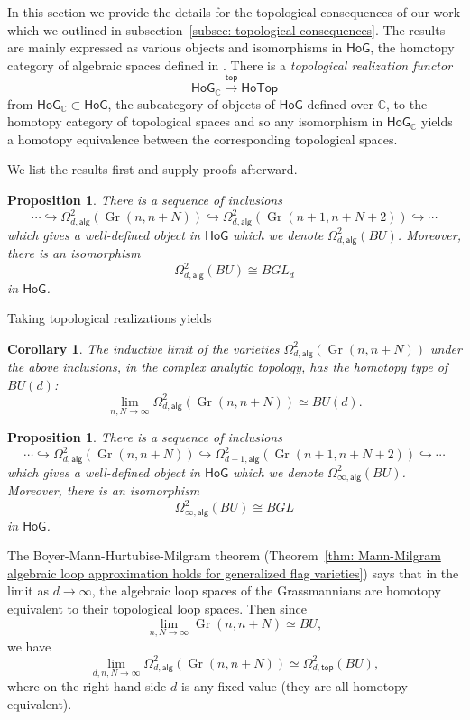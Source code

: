 \message{ !name(Bryan-Vakil.tex)}\documentclass{amsart}
\newtheorem{proposition}[theorem]{Proposition}
\newtheorem{corollary}[theorem]{Corollary}
\theoremstyle{definition}
\newcommand{\CC} {{\mathbb C}}          %
\newcommand{\HoG}{\textsf{HoG}}
\newcommand{\HoTop}{\textsf{HoTop}}
\newcommand{\alg}{\mathsf{alg}}
\renewcommand{\top}{\mathsf{top}}
\newcommand{\Gr}{\operatorname{Gr}}
\newcommand{\LoopTwo}{\Omega^{2}_{d,\alg}}
\newcommand{\LoopTwoTop}{\Omega^{2}_{d,\top}}
\newcommand{\homotopyeq}{\simeq}
\begin{document}
In this section we provide the details for the topological
consequences of our work which we outlined in subsection~\ref{subsec:
topological consequences}. The results are mainly expressed as various
objects and isomorphisms in $\HoG$, the homotopy category of algebraic
spaces defined in \cite{Larson-Vakil-BottPeriodicity}. There is a
\emph{topological realization functor} 
\[
\HoG_{\CC } \xrightarrow{\top } \HoTop
\] 
from $\HoG_{\CC }\subset \HoG$, the subcategory of objects of $\HoG$ defined
over $\CC$,  to the homotopy category of topological spaces and so any
isomorphism in $\HoG_{\CC}$ yields a homotopy equivalence between the
corresponding topological spaces.

We list the results first and supply proofs afterward.

\begin{proposition}\label{prop: Loop2(BU)=BGLd in HoG}
There is a sequence of inclusions
\[
\dotsb \hookrightarrow \LoopTwo (\Gr (n,n+N))\hookrightarrow \LoopTwo
(\Gr (n+1,n+N+2))\hookrightarrow \dotsb
\]
which gives a well-defined object in $\HoG$ which we denote $\LoopTwo
(BU)$. Moreover, there is an isomorphism
\[
\LoopTwo (BU)\cong BGL_{d}
\]
in $\HoG$. 
\end{proposition}

Taking topological realizations yields

\begin{corollary}
The inductive limit of the varieties $\LoopTwo (\Gr (n,n+N))$ under
the above inclusions, in the complex analytic topology, has the
homotopy type of $BU(d)$:
\[
\lim_{n,N\to \infty} \LoopTwo (\Gr (n,n+N)) \homotopyeq BU(d).
\]
\end{corollary}

\begin{proposition}\label{prop: Loop2inft(BU)=BGL in HoG}
There is a sequence of inclusions 
\[
\dotsb \hookrightarrow \LoopTwo (\Gr (n,n+N))
\hookrightarrow \Omega^{2}_{d+1,\alg} (\Gr (n+1,n+N+2)) \hookrightarrow \dotsb 
\]
which gives a well-defined object in $\HoG$ which we denote
$\Omega^{2}_{\infty ,\alg}(BU)$. Moreover, there is an isomorphism
\[
\Omega^{2}_{\infty ,\alg}(BU)\cong BGL
\]
in $\HoG$. 
\end{proposition}

The Boyer-Mann-Hurtubise-Milgram theorem
(Theorem~\ref{thm: Mann-Milgram algebraic loop approximation
holds for generalized flag varieties})
says that in the limit as $d\to \infty$, the
algebraic loop spaces of the Grassmannians are homotopy equivalent to
their topological loop spaces. Then since
\[
\lim_{n,N\to \infty} \Gr (n,n+N) \homotopyeq  BU,
\]
we have
\[
\lim_{d,n,N\to \infty} \LoopTwo (\Gr (n,n+N)) \homotopyeq \LoopTwoTop (BU), 
\]
where on the right-hand side $d$ is any fixed value (they are all
homotopy equivalent). 
\end{document}
